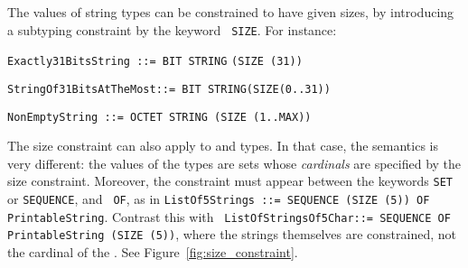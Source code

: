 The values of string types can be constrained to have given sizes,
by introducing a subtyping constraint by the keyword \texttt{\small
SIZE}. For instance:

\noindent
\texttt{\small Exactly31BitsString ::= BIT STRING} 
\texttt{\small (SIZE (31))}

\noindent
\texttt{\small StringOf31BitsAtTheMost::= BIT STRING(SIZE(0..31))}

\noindent
\texttt{\small NonEmptyString ::= OCTET STRING (SIZE (1..MAX))}

The size constraint can also apply to \kwdSETOF{} and \kwdSEQUENCEOF{}
types. In that case, the semantics is very different: the values of
the types are sets whose \emph{cardinals} are specified by the size
constraint. Moreover, the constraint must appear between the keywords
\texttt{\small SET} or \texttt{\small SEQUENCE}, and \texttt{\small
  OF}, as in \texttt{\small List\-Of5\-Strings ::= SEQUENCE (SIZE (5))
  OF Print\-able\-String}. Contrast this with \texttt{\small
  List\-Of\-Strings\-Of5\-Char::= SEQUENCE OF Print\-able\-String
  (SIZE (5))}, where the strings themselves are constrained, not the
cardinal of the \kwdSEQUENCEOF. See Figure~\ref{fig:size_constraint}.
